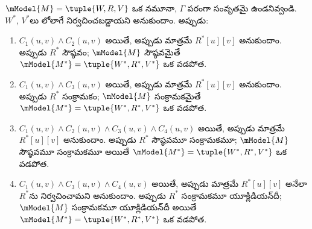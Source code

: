 \documentclass[../../../include/open-logic-section]{subfiles}
\begin{document}
\begin{thm}
  $\mModel{M} =\tuple{W,R,V}$ ఒక నమూనా,
  $\Gamma$  పరంగా
  సంవృతమై ఉండనివ్వండి. $W^*$, $V^*$లు
  లోలాగే
  నిర్వచించబడ్డాయని అనుకుందాం. అప్పుడు:
  \begin{enumerate}
  \item $C_1(u, v) \land C_2(u,v)$ అయితే, అప్పుడు
    మాత్రమే $R^*[u][v]$ అనుకుందాం. అప్పుడు $R^*$
    సౌష్ఠవం; $\mModel{M}$ సౌష్ఠవమైతే
    $\mModel{M^*} = \tuple{W^*,R^*,V^*}$ ఒక వడపోత.
  \item $C_1(u, v) \land C_3(u,v)$ అయితే, అప్పుడు
    మాత్రమే $R^*[u][v]$ అనుకుందాం. అప్పుడు $R^*$
    సంక్రామకం; $\mModel{M}$ సంక్రామకమైతే
    $\mModel{M^*}=\tuple{W^*,R^*,V^*}$ ఒక వడపోత.
  \item $C_1(u, v) \land C_2(u,v)
    \land C_3(u,v) \land C_4(u,v)$ అయితే,
    అప్పుడు మాత్రమే $R^*[u][v]$ అనుకుందాం.
    అప్పుడు $R^*$ సౌష్ఠవమూ సంక్రామకమూ;
    $\mModel{M}$ సౌష్ఠవమూ సంక్రామకమూ అయితే
    $\mModel{M^*}=\tuple{W^*,R^*,V^*}$ ఒక వడపోత.
  \item $C_1(u,
    v) \land C_3(u,v) \land C_4(u,v)$ అయితే,
    అప్పుడు మాత్రమే $R^*[u][v]$ అనేలా $R^*$ను
    నిర్వచించామని అనుకుందాం. అప్పుడు $R^*$ సంక్రామకమూ
    యూక్లిడియన్‌దీ; $\mModel{M}$ సంక్రామకమూ
    యూక్లిడియన్‌దీ అయితే
    $\mModel{M^*}=\tuple{W^*,R^*,V^*}$ ఒక వడపోత.
  \end{enumerate}
\end{thm}
\end{document}
